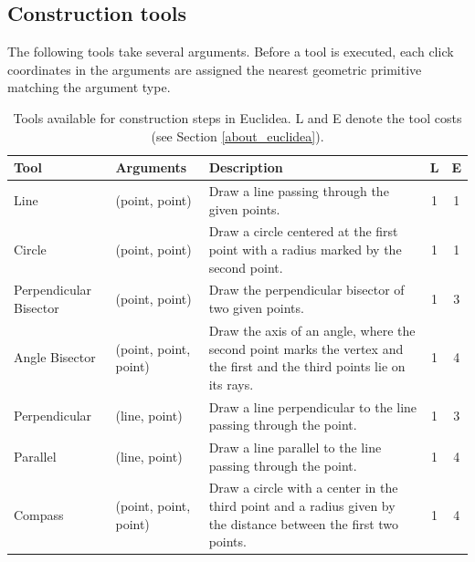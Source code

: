 \subsection{Construction tools}
The following tools take several arguments. Before a tool is executed, each click coordinates in the arguments are assigned the nearest geometric primitive matching the argument type.
\begin{table}[!htb]
\begin{center}
 \begin{tabular}{| m{2.7cm}| m{3.8cm} | m{5.2cm}| c{0.5cm} | c{0.5cm} |} 
 \hline
 \bfseries Tool &
 \bfseries Arguments &
 \bfseries Description & \bfseries L  &
 \bfseries E  \\
 \hline
 Line &
 (point, point) &
 Draw a line passing through the given points. &
 1 & 1 \\
 \hline
 Circle &
 (point, point) &
 Draw a circle centered at the first point with a radius marked by the second point.
 & 1 & 1 \\
 \hline
 Perpendicular Bisector &
 (point, point) &
 Draw the perpendicular bisector of two given points. & 1 & 3 \\
 \hline 
 Angle Bisector &
 (point, point, point) &
 Draw the axis of an angle, where the second point marks the vertex and the first and the third points lie on its rays. &
 1 & 4 \\
 \hline
 Perpendicular &
 (line, point) &
 Draw a line perpendicular to the line passing through the point. &
 1 & 3 \\
 \hline
 Parallel &
 (line, point) &
 Draw a line parallel to the line passing through the point. & 1 & 4 \\
 \hline
 Compass &
 (point, point, point) &
 Draw a circle with a center in the third point and a radius given by the distance between the first two points. &
 1 & 4 \\
 \hline
\end{tabular}
\caption{Tools available for construction steps in Euclidea. L and E denote the tool costs (see Section \ref{about_euclidea}).}
\end{center}

\end{table}

